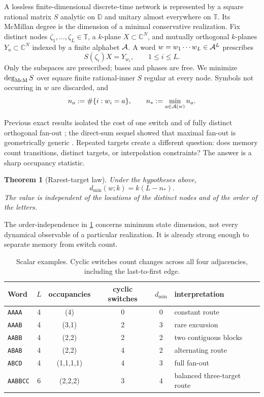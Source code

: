 \documentclass[11pt]{article}
\newtheorem{theorem}{Theorem}[section]
\theoremstyle{definition}\newtheorem{definition}[theorem]{Definition}\newtheorem{example}[theorem]{Example}
\theoremstyle{remark}\newtheorem{remark}[theorem]{Remark}\newtheorem{limitation}[theorem]{Limitation}
\newcommand{\C}{\mathbb C}\newcommand{\D}{\mathbb D}\newcommand{\T}{\mathbb T}
\begin{document}
A lossless finite-dimensional discrete-time network is represented by a
square rational matrix $S$ analytic on $\D$ and unitary almost everywhere on
$\T$.  Its McMillan degree is the dimension of a minimal conservative
realization.  Fix distinct nodes $\zeta_1,\ldots,\zeta_L\in\T$, a
$k$-plane $X\subset\C^N$, and mutually orthogonal $k$-planes
$Y_a\subset\C^N$ indexed by a finite alphabet $\mathcal A$.  A word
$w=w_1\cdots w_L\in\mathcal A^L$ prescribes
\begin{equation}\label{eq:task}
                         S(\zeta_i)X=Y_{w_i},\qquad 1\le i\le L.
\end{equation}
Only the subspaces are prescribed; bases and phases are free.  We minimize
$\deg_{\mathrm{McM}} S$ over square finite rational-inner $S$ regular at every node.
Symbols not occurring in $w$ are discarded, and
\[
 n_a:=\#\{i:w_i=a\},\qquad n_*:=\min_{a\in\mathcal A(w)}n_a.
\]

Previous exact results isolated the cost of one switch and of fully
distinct orthogonal fan-out \cite{ErikssonSwitch2026,ErikssonGlobalFanout2026};
the direct-sum sequel showed that maximal fan-out is geometrically generic
\cite{ErikssonDirectSum2026}.  Repeated targets create a different question:
does memory count transitions, distinct targets, or interpolation
constraints?  The answer is a sharp occupancy statistic.

\begin{theorem}[Rarest-target law]\label{thm:main}
Under the hypotheses above,
\begin{equation}\label{eq:law}
             d_{\min}(w;k)=k(L-n_*).
\end{equation}
The value is independent of the locations of the distinct nodes and of the
order of the letters.
\end{theorem}

The order-independence in \cref{thm:main} concerns minimum state dimension,
not every dynamical observable of a particular realization.  It is already
strong enough to separate memory from switch count.

\begin{table}[b]
\centering\small
\caption{Scalar examples.  Cyclic switches count changes across all four
adjacencies, including the last-to-first edge.}
\label{tab:words}
\begin{tabular}{@{}lccccl@{}}\toprule
Word & $L$ & occupancies & cyclic switches & $d_{\min}$ & interpretation\\\midrule
\texttt{AAAA} &4&(4)&0&0&constant route\\
\texttt{AAAB} &4&(3,1)&2&3&rare excursion\\
\texttt{AABB} &4&(2,2)&2&2&two contiguous blocks\\
\texttt{ABAB} &4&(2,2)&4&2&alternating route\\
\texttt{ABCD} &4&(1,1,1,1)&4&3&full fan-out\\
\texttt{AABBCC}&6&(2,2,2)&3&4&balanced three-target route\\
\bottomrule\end{tabular}
\end{table}
\end{document}
